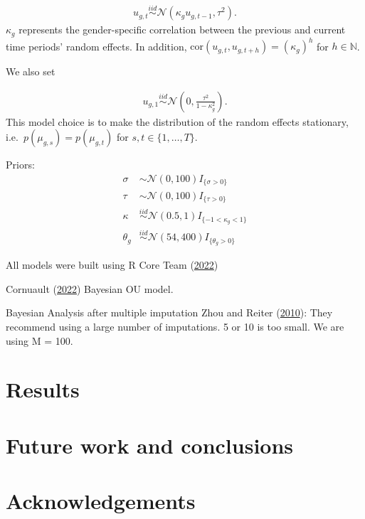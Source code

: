\documentclass[
  12pt,
]{article}
\begin{document}
\[
\begin{aligned}
u_{g,t} \overset{iid}{\sim}\mathcal{N}(\kappa_g u_{g,t-1} , \tau^2).
\end{aligned}
\] \(\kappa_g\) represents the gender-specific correlation between the
previous and current time periods' random effects. In addition,
\(\text{cor}(u_{g,t},u_{g,t+h}) = (\kappa_g)^h\) for
\(h \in \mathbb{N}\).

We also set

\[
\begin{aligned}
u_{g,1} \overset{iid}{\sim}\mathcal{N}\left(0,\frac{\tau^2}{1-\kappa_g^2}\right).
\end{aligned}
\] This model choice is to make the distribution of the random effects
stationary, i.e.~\(p(\mu_{g,s}) = p(\mu_{g,t})\) for
\(s,t \in \{1,\dots,T\}\).

Priors: \[
\begin{aligned}
\sigma & \sim \mathcal{N}(0,100)I_{\{\sigma > 0\}} \\
\tau & \sim \mathcal{N}(0,100)I_{\{\tau > 0\}} \\
\kappa & \overset{iid}{\sim}\mathcal{N}(0.5,1)I_{\{-1 < \kappa_g < 1\}} \\
\theta_g & \overset{iid}{\sim}\mathcal{N}(54,400)I_{\{\theta_g > 0\}}
\end{aligned}
\]

All models were built using R Core Team
(\protect\hyperlink{ref-R2022language}{2022})

Cornuault (\protect\hyperlink{ref-Cornault2022}{2022}) Bayesian OU
model.

Bayesian Analysis after multiple imputation Zhou and Reiter
(\protect\hyperlink{ref-ZhouReiter2009}{2010}): They recommend using a
large number of imputations. 5 or 10 is too small. We are using M = 100.

\hypertarget{sec:results}{%
\section{Results}\label{sec:results}}

\hypertarget{sec:conclusions}{%
\section{Future work and conclusions}\label{sec:conclusions}}

\hypertarget{acknowledgements}{%
\section*{Acknowledgements}\label{acknowledgements}}
\end{document}
